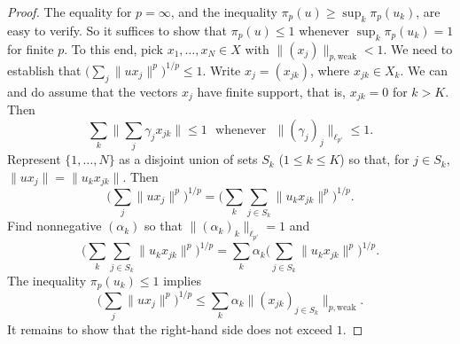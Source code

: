\documentclass{amsart}
\theoremstyle{plain}
\theoremstyle{definition}
\numberwithin{equation}{section}
\begin{document}
\begin{proof}
The equality for $p=\infty$, and the inequality $\pi_p(u) \geq \sup_k \pi_p(u_k)$, are easy to verify. So it suffices to show that $\pi_p(u) \leq 1$ whenever $\sup_k \pi_p(u_k) = 1$ for finite $p$.
To this end, pick $x_1, \ldots, x_N \in X$ with $\|(x_j)\|_{p,{\textrm{weak}}} < 1$. We need to establish that $\big( \sum_j \|u x_j\|^p \big)^{1/p} \leq 1$. 
Write $x_j = (x_{jk})$, where $x_{jk} \in X_k$. We can and do assume that the vectors $x_j$ have finite support, that is, $x_{jk} = 0$ for $k > K$. Then
\begin{equation}
\sum_k \big\| \sum_j \gamma_j x_{jk} \big\| \leq 1 \, \, {\textrm{  whenever  }} \, \, \|(\gamma_j)_j\|_{\ell_{p'}} \leq 1 .
\label{eq:bound on sum}
\end{equation}
Represent $\{1, \ldots, N\}$ as a disjoint union of sets $S_k$ ($1 \leq k \leq K$) so that, for $j \in S_k$, $\|u x_j\| = \|u_k x_{jk}\|$. Then
$$
\big( \sum_j \|u x_j\|^p \big)^{1/p} = \Big( \sum_k \sum_{j \in S_k} \|u_k x_{jk}\|^p \Big)^{1/p} .
$$
Find nonnegative $(\alpha_k)$ so that $ \|(\alpha_k)_k\|_{\ell_{p'}} = 1$ and 
$$
\Big( \sum_k \sum_{j \in S_k} \|u_k x_{jk}\|^p \Big)^{1/p} =
\sum_k \alpha_k \Big( \sum_{j \in S_k} \|u_k x_{jk}\|^p \Big)^{1/p} .
$$
The inequality $\pi_p(u_k) \leq 1$ implies
$$
\big( \sum_j \|u x_j\|^p \big)^{1/p} \leq \sum_k \alpha_k \| (x_{jk})_{j \in S_k} \|_{p, \textrm{weak}} .
$$
It remains to show that the right-hand side does not exceed $1$.


\end{proof}
\end{document}
